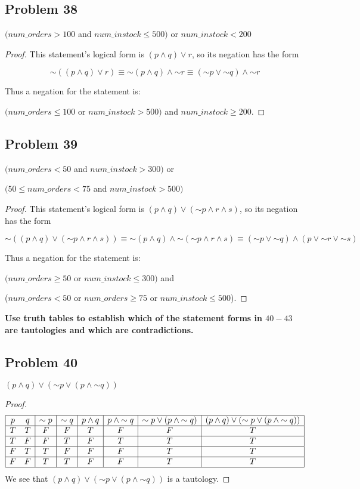 \documentclass[14pt]{extarticle}
\begin{document}
\subsection{Problem 38}
$(num\_orders > 100$ and $num\_instock \leq 500)$ or $num\_instock < 200$

\begin{proof}
This statement’s logical form is $(p \wedge q) \vee r$, so its negation has the form

$$
{\sim((p \wedge q) \vee r)} \equiv {\sim (p \wedge q)} \wedge {\sim r}
\equiv ({\sim p} \vee {\sim q}) \wedge {\sim r}
$$

Thus a negation for the statement is:

$(num\_orders \leq 100$ or $num\_instock > 500)$ and $num\_instock \geq 200$.
\end{proof}

\subsection{Problem 39}
$(num\_orders < 50$ and $num\_instock > 300)$ or

$(50 \leq num\_orders < 75$ and $num\_instock > 500)$

\begin{proof}
This statement’s logical form is $(p \wedge q) \vee ({\sim p} \wedge r \wedge s)$, so its negation has the form

$$
{\sim((p \wedge q) \vee ({\sim p} \wedge r \wedge s))} \equiv
{\sim(p \wedge q)} \wedge {\sim({\sim p} \wedge r \wedge s)} \equiv
({\sim p} \vee {\sim q}) \wedge (p \vee {\sim r} \vee {\sim s})
$$

Thus a negation for the statement is:

$(num\_orders \geq 50$ or $num\_instock \leq 300)$ and

($num\_orders < 50$ or $num\_orders \geq 75$ or $num\_instock \leq 500$).
\end{proof}

{\bf Use truth tables to establish which of the statement forms in $40-43$ are tautologies and which are contradictions.}

\subsection{Problem 40}
$(p \wedge q) \vee ({\sim p} \vee (p \wedge {\sim q}))$

\begin{proof}
$$
\begin{array}{|cc|c|c|c|c|c|c|}
\hline
p & q & {\sim p} & {\sim q} & p \wedge q & p \wedge {\sim q} &
{\sim p} \vee (p \wedge {\sim q}) &
(p \wedge q) \vee ({\sim p} \vee (p \wedge {\sim q})) \\
\hline
T & T & F & F & T & F & F & T \\
\hline
T & F & F & T & F & T & T & T \\
\hline
F & T & T & F & F & F & T & T \\
\hline
F & F & T & T & F & F & T & T \\
\hline
\end{array}
$$
We see that $(p \wedge q) \vee ({\sim p} \vee (p \wedge {\sim q}))$ is a tautology.
\end{proof}
\end{document}
